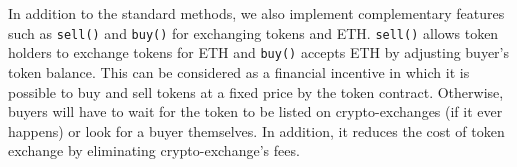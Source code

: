 In addition to the standard \erc methods, we also implement complementary features such as \texttt{sell()} and \texttt{buy()} for exchanging tokens and ETH. \texttt{sell()} allows token holders to exchange tokens for ETH and \texttt{buy()} accepts ETH by adjusting buyer's token balance. {\blue This can be considered as a financial incentive in which it is possible to buy and sell tokens at a fixed price by the token contract. Otherwise, buyers will have to wait for the token to be listed on crypto-exchanges (if it ever happens) or look for a buyer themselves. In addition, it reduces the cost of token exchange by eliminating crypto-exchange's fees.}


%

